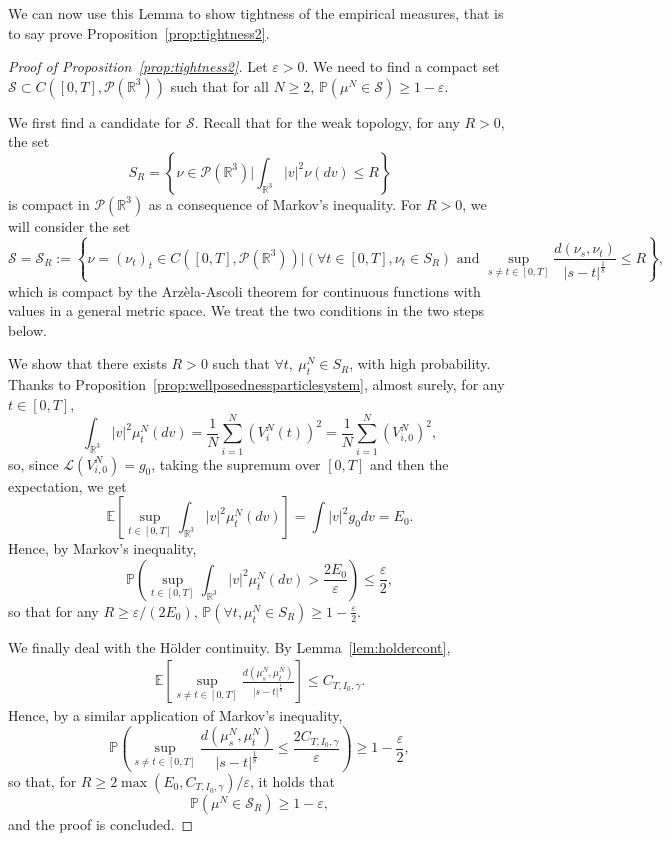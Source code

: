 \documentclass[11pt,a4paper]{article}
\theoremstyle{definition}
\theoremstyle{plain}
\begin{document}
We can now use this Lemma to show tightness of the empirical measures, that is to say prove Proposition~\ref{prop:tightness2}.
\begin{proof}[Proof of Proposition~\ref{prop:tightness2}]
Let $\varepsilon>0$. We need to find a compact set $\mathcal{S} \subset C\left([0,T],\mathcal{P}(\mathbb{R}^3)\right)$ such that for all $N \geq 2$, $\mathbb{P}(\mu^N \in \mathcal{S})\geq 1-\varepsilon.$

We first find a candidate for $\mathcal{S}$. Recall that for the weak topology, for any $R>0$, the set
$$S_R = \left\{ \nu \in \mathcal{P}(\mathbb{R}^3) \Bigg\vert \int_{\mathbb{R}^3}\vert v\vert^2 \nu(dv) \leq R\right\}$$
is compact in $\mathcal{P}(\mathbb{R}^3)$ as a consequence of Markov's inequality. For $R>0$, we will consider the set
\begin{equation}
\label{eq:defcompactS}
\mathcal{S}=\mathcal{S}_{R}:= \left\{ \nu=(\nu_t)_t \in C\left([0,T],\mathcal{P}(\mathbb{R}^3)\right) \Bigg \vert (\forall t \in [0,T], \nu_t \in S_R)  \text{ and } \sup_{s\neq t\in[0,T]} \frac{d(\nu_s,\nu_t)}{\vert s-t \vert^\frac{1}{8}}\leq R\right\},
\end{equation}
which is compact by the Arzèla-Ascoli theorem for continuous functions with values in a general metric space. We treat the two conditions in the two steps below.

We show that there exists $R>0$ such that $\forall t,\ \mu^N_t \in S_R$, with high probability. Thanks to Proposition~\ref{prop:wellposednessparticlesystem}, almost surely, for any $t\in [0,T]$, $$\int_{\mathbb{R}^3} \vert v\vert^2 \mu^N_t(dv)= \frac{1}{N}\sum_{i=1}^N (V^N_i(t))^2=\frac{1}{N}\sum_{i=1}^N (V^N_{i,0})^2,$$
so, since $\mathcal{L}(V^N_{i,0})=g_0$, taking the supremum over $[0,T]$ and then the expectation, we get 
$$\mathbb{E}\left[\sup_{t\in[0,T]}\int_{\mathbb{R}^3} \vert v\vert^2 \mu^N_t(dv)\right]=\int \vert v \vert^2 g_0 dv=E_0.$$
Hence, by Markov's inequality,
\begin{equation*}
\label{eq:tightnesscond1}
    \mathbb{P}\left( \sup_{t\in[0,T]}\int_{\mathbb{R}^3} \vert v\vert^2 \mu^N_t(dv) > \frac{2E_0}{\varepsilon} \right) \leq \frac{\varepsilon}{2},
\end{equation*}
so that for any $R\geq \varepsilon/(2E_0)$, $\mathbb{P}(\forall t, \mu^N_t \in S_{R})\geq 1-\frac{\varepsilon}{2}.$

We finally deal with the Hölder continuity. By Lemma~\ref{lem:holdercont},
\begin{align*}
   \mathbb{E}\left[  \sup_{s\neq t\in[0,T]} \frac{d(\mu^N_s,\mu^N_t)}{\vert s-t \vert^\frac{1}{8}} \right]\leq C_{T,I_0,\gamma}.
\end{align*}
Hence, by a similar application of Markov's inequality,
\begin{equation*}
\label{eq:tightnesscond1}
    \mathbb{P}\left( \sup_{s\neq t\in[0,T]} \frac{d(\mu^N_s,\mu^N_t)}{\vert s-t \vert^\frac{1}{8}} \leq \frac{2C_{T,I_0,\gamma}}{\varepsilon} \right) \geq 1-\frac{\varepsilon}{2},
\end{equation*}
so that, for $R\geq 2\max{(E_0,C_{T,I_0,\gamma})}/\varepsilon$, it holds that
$$\mathbb{P}\left( \mu^N \in \mathcal{S}_R \right) \geq 1-\varepsilon,$$ and the proof is concluded.
\end{proof}
\end{document}
